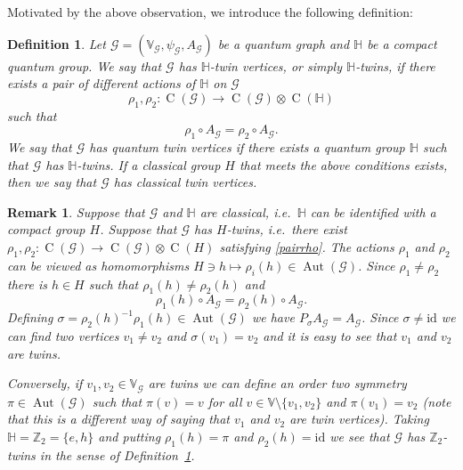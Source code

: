 \documentclass[11pt,reqno]{amsart}
\newtheorem{definition}[proposition]{Definition}
\newtheorem{remark}[proposition]{Remark}
\newcommand{\id}{\mathrm{id}}
\newcommand{\tens}{\otimes}
\newcommand{\HH}{\mathbb{H}}
\DeclareMathOperator{\Aut}{Aut}
\DeclareMathOperator{\C}{C}
\begin{document}
Motivated by the above observation, we introduce the following definition:

\begin{definition}\label{defin_twins1}
Let $\mathcal{G}=(\mathbb{V}_{\scriptscriptstyle\mathcal{G}},\psi_{\scriptscriptstyle\mathcal{G}}, A_{\scriptscriptstyle\mathcal{G}})$ be a quantum graph and $\HH$ be a compact quantum group. We say that $\mathcal{G}$ has \emph{$\HH$-twin vertices}, or simply \emph{$\HH$-twins}, if there exists a pair of different actions of $\HH$ on $\mathcal{G}$
\[
\rho_1,\rho_2\colon\C(\mathcal{G})\to\C(\mathcal{G})\tens\C(\HH)
\]
such that
\begin{equation}\label{pairrho}
\rho_{1}\circ A_{\scriptscriptstyle\mathcal{G}}=\rho_{2}\circ A_{\scriptscriptstyle\mathcal{G}}.
\end{equation}
We say that $\mathcal{G}$ has \emph{quantum twin vertices} if there exists a quantum group $\HH$ such that $\mathcal{G}$ has $\HH$-twins. If a classical group $H$ that meets the above conditions exists, then we say that $\mathcal{G}$ has \emph{classical twin vertices}.
\end{definition}

\begin{remark}
Suppose that $\mathcal{G}$ and $\HH$ are classical, i.e.~$\HH$ can be identified with a compact group $H$. Suppose that $\mathcal{G}$ has $H$-twins, i.e.~there exist $\rho_1,\rho_2\colon\C(\mathcal{G})\to\C(\mathcal{G})\tens\C(H)$ satisfying \eqref{pairrho}. The actions $\rho_1$ and $\rho_2$ can be viewed as homomorphisms $H\ni h\mapsto\rho_i(h)\in\Aut(\mathcal{G})$. Since $\rho_1\neq\rho_2$ there is $h\in H$ such that $\rho_1(h)\neq\rho_2(h)$ and
\[
\rho_{1}(h)\circ A_{\scriptscriptstyle\mathcal{G}}=\rho_{2}(h)\circ A_{\scriptscriptstyle\mathcal{G}}.
\]
Defining $\sigma =\rho_{2}(h)^{-1}\rho_{1}(h)\in\Aut(\mathcal{G})$ we have $P_\sigma A_{\scriptscriptstyle\mathcal{G}} = A_{\scriptscriptstyle\mathcal{G}}$. Since $\sigma\neq\id$ we can find two vertices $v_1\neq v_2$ and $\sigma(v_1) = v_2$ and it is easy to see that $v_1$ and $v_2$ are twins.

Conversely, if $v_1,v_2\in\mathbb{V}_\mathcal{G}$ are twins we can define an order two symmetry $\pi\in\Aut(\mathcal{G})$ such that $\pi(v) = v$ for all $v\in\mathbb{V}\setminus\{v_1,v_2\}$ and $\pi(v_1) = v_2$ (note that this is a different way of saying that $v_1$ and $v_2$ are twin vertices). Taking $\HH =\mathbb{Z}_2=\{e,h\}$ and putting $\rho_1(h)=\pi$ and $\rho_2(h) =\id$ we see that $\mathcal{G}$ has $\mathbb{Z}_2$-twins in the sense of Definition~\ref{defin_twins1}.
\end{remark}
\end{document}
